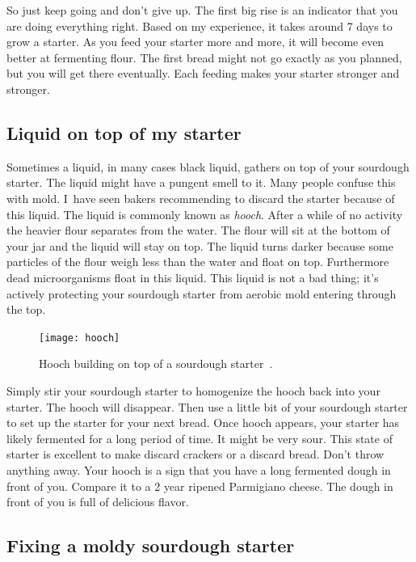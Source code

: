 So just keep going and don't give up. The first big
rise is an indicator that you are doing everything
right. Based on my experience, it takes around 7
days to grow a starter. As you feed your starter
more and more, it will become even better at fermenting
flour. The first bread might not go exactly as you
planned, but you will get there eventually. Each
feeding makes your starter stronger and stronger.

\subsection{Liquid on top of my starter}

Sometimes a liquid, in many cases black liquid, gathers on top
of your sourdough starter. The liquid might have a pungent
smell to it. Many people confuse this with mold. I~have seen
bakers recommending to discard the starter because of this liquid.
The liquid is commonly known as \emph{hooch}. After a while
of no activity the heavier flour separates from the water. The flour
will sit at the bottom of your jar and the liquid will stay on top.
The liquid turns darker because some particles of the flour weigh
less than the water and float on top. Furthermore dead microorganisms
float in this liquid. This liquid is not a bad thing; it's actively
protecting your sourdough starter from aerobic mold entering through
the top.

\begin{figure}[!htb]
\begin{center}
  \texttt{[image: hooch]}
  \caption[Hooch] {Hooch building on top of a sourdough
      starter~\cite{liquid+on+starter}.}%
  \label{fig:hooch}
\end{center}
\end{figure}

Simply stir your sourdough starter to homogenize the hooch back
into your starter. The hooch will disappear. Then use a little bit of
your sourdough starter to set up the starter for your next bread.
Once hooch appears, your starter has likely fermented for a long
period of time. It might be very sour. This state of starter
is excellent to make discard crackers or a discard bread. Don't throw
anything away. Your hooch is a sign that you have a long fermented
dough in front of you. Compare it to a 2 year ripened Parmigiano cheese.
The dough in front of you is full of delicious flavor.

\subsection{Fixing a moldy sourdough starter}

